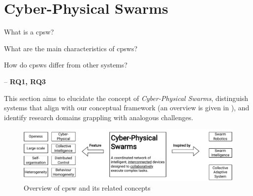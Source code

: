 \chapter{Cyber-Physical Swarms}\label{chap:cpsw}\mtcaddchapter
\begin{flushright}
\begin{minipage}{0.5\textwidth}
    What is a \acf{cpsw}? 
    
    What are the main characteristics of \acp{cpsw}? 
    
    How do \acp{cpsw} differ from other systems?

    -- \textbf{RQ1, RQ3}    
\end{minipage}
    
\end{flushright}
\minitoc%
This section aims to elucidate the concept of \textit{Cyber-Physical Swarms}, 
 distinguish systems that align with our conceptual framework (an overview is given in ), 
 and identify research domains grappling with analogous challenges. 
% 
\begin{figure}
    \includegraphics[width=\textwidth]{chapters/img/cyber-physical-swarms-overview.drawio.pdf}
    \caption{Overview of \acf{cpsw} and its related concepts}\label{fig:overview-cpsw}
\end{figure}
